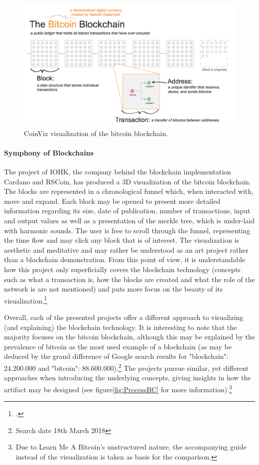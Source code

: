\begin{figure}
    \centering
    \includegraphics[width=\linewidth]{latex-vorlage_v1.5/graphics/CoinViz.png}
    \caption[CoinViz visualization of the bitcoin blockchain.]{CoinViz visualization of the bitcoin blockchain.\footnotemark}
    \label{fig:CoinViz}
\end{figure}

\paragraph{Symphony of Blockchains} The project of IOHK, the company behind the blockchain implementation Cardano and RSCoin, has produced a 3D visualization of the bitcoin blockchain. The blocks are represented in a chronological funnel which, when interacted with, move and expand. Each block may be opened to present more detailed information regarding its size, date of publication, number of transactions, input and output values as well as a presentation of the merkle tree, which is under-laid with harmonic sounds. The user is free to scroll through the funnel, representing the time flow and may click any block that is of interest. The visualization is aesthetic and meditative and may rather be understood as an art project rather than a blockchain demonstration. From this point of view, it is understandable how this project only superficially covers the blockchain technology (concepts such as what a transaction is, how the blocks are created and what the role of the network is are not mentioned) and puts more focus on the beauty of its visualization.\footcite[Cf.][]{IOHKSymphonyBlockchains2018} 

Overall, each of the presented projects offer a different approach to visualizing (and explaining) the blockchain technology. It is interesting to note that the majority focuses on the bitcoin blockchain, although this may be explained by the prevalence of bitcoin as the most used example of a blockchain (as may be deduced by the grand difference of Google search results for "blockchain": 24.200.000 and "bitcoin": 88.600.000).\footnote{Search date 18th March 2018} The projects pursue similar, yet different approaches when introducing the underlying concepts, giving insights in how the artifact may be designed (see figure\ref{fig:ProcessBC} for more information).\footnote{Due to Learn Me A Bitcoin's unstructured nature, the accompanying guide instead of the visualization is taken as basis for the comparison.} 

